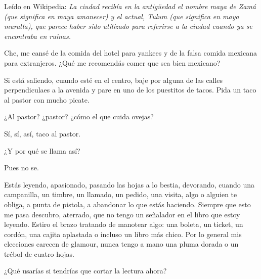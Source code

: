 \documentclass[12pt,twoside,openright,a5paper]{book}
\begin{document}
Leído en Wikipedia: \emph{La ciudad recibía en la
antigüedad el nombre maya de Zamá (que significa en maya amanecer) y
el actual, Tulum (que significa en maya muralla), que parece haber sido
utilizado para referirse a la ciudad cuando ya se encontraba en ruinas.}


\vspace{0.5cm}
\hrulefill\hspace{0.2cm} \decofourleft\decofourright \hspace{0.2cm} \hrulefill
\vspace{0.5cm}

Che, me cansé de la comida del hotel para yankees y de la falsa comida
mexicana para extranjeros. ¿Qué me recomendás comer que sea bien mexicano?

Si está saliendo, cuando esté en el centro, baje por alguna de las calles
perpendiculaes a la avenida y pare en uno de los puestitos de tacos. Pida
un taco al pastor con mucho picate.

¿Al pastor? ¿pastor? ¿cómo el que cuida ovejas?

Sí, sí, así, taco al pastor.

¿Y por qué se llama así?

Pues no se.


\vspace{0.5cm}
\hrulefill\hspace{0.2cm} \decofourleft\decofourright \hspace{0.2cm} \hrulefill
\vspace{0.5cm}

Estás leyendo, apasionado, pasando las hojas a lo bestia, devorando, cuando
una campanilla, un timbre, un llamado, un pedido, una visita, algo o alguien
te obliga, a punta de pistola, a abandonar lo que estás haciendo. Siempre
que esto me pasa descubro, aterrado, que no tengo un señalador en el libro
que estoy leyendo. Estiro el brazo tratando de manotear algo: una boleta, un
ticket, un cordón, una cajita aplastada o incluso un libro más chico. Por
lo general mis elecciones carecen de glamour, nunca tengo a mano una pluma
dorada o un trébol de cuatro hojas.

¿Qué usarías si tendrías que cortar la lectura ahora?


\vspace{0.5cm}
\hrulefill\hspace{0.2cm} \decofourleft\decofourright \hspace{0.2cm} \hrulefill
\vspace{0.5cm}
\end{document}
